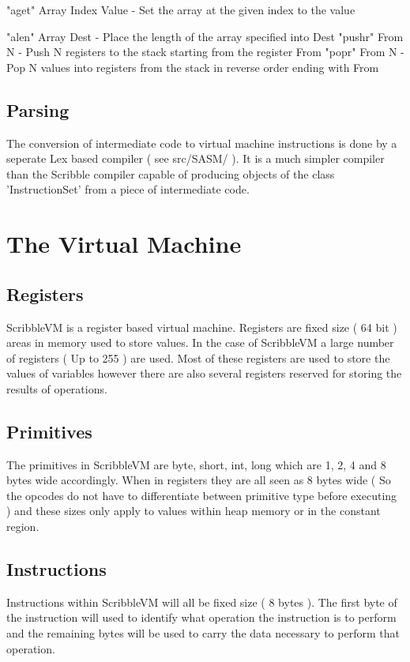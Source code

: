\documentclass[]{final_report}
\begin{document}
"aget" Array Index Value - Set the array at the given index to the value

"alen" Array Dest - Place the length of the array specified into Dest 
"pushr" From N - Push N registers to the stack starting from the register From
"popr" From N - Pop N values into registers from the stack in reverse order ending with From

\section{Parsing}

The conversion of intermediate code to virtual machine instructions is done by a seperate Lex based compiler ( see src/SASM/ ). It is a much simpler compiler than the Scribble compiler capable of producing objects of the class 'InstructionSet' from a piece of intermediate code.

\chapter{The Virtual Machine}

\section{Registers}

ScribbleVM is a register based virtual machine. Registers are fixed size ( 64 bit ) areas in memory used to
store values. In the case of ScribbleVM a large number of registers ( Up to 255 ) are used. Most of these
registers are used to store the values of variables however there are also several registers reserved for
storing the results of operations.

\section{Primitives}

The primitives in ScribbleVM are byte, short, int, long which are 1, 2, 4 and 8 bytes wide accordingly. When
in registers they are all seen as 8 bytes wide ( So the opcodes do not have to differentiate between primitive
type before executing ) and these sizes only apply to values within heap memory or in the constant region.

\section{Instructions}

Instructions within ScribbleVM will all be fixed size ( 8 bytes ). The first byte of the instruction will used to
identify what operation the instruction is to perform and the remaining bytes will be used to carry the data
necessary to perform that operation.
\end{document}
